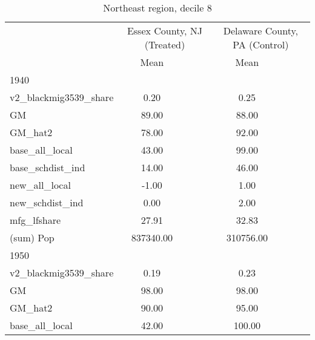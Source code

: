 \begin{table}[htbp]\centering
\def\sym#1{\ifmmode^{#1}\else\(^{#1}\)\fi}
\caption{Northeast region, decile 8 \label{tab1}}
\begin{tabular}{l*{2}{ccc}}
\toprule
                    &\multicolumn{3}{c}{Essex County, NJ (Treated)}&\multicolumn{3}{c}{Delaware County, PA (Control)}\\
                    &        Mean&            &            &        Mean&            &            \\
\midrule
1940                &            &            &            &            &            &            \\
v2\_blackmig3539\_share&        0.20&            &            &        0.25&            &            \\
GM                  &       89.00&            &            &       88.00&            &            \\
GM\_hat2             &       78.00&            &            &       92.00&            &            \\
base\_all\_local      &       43.00&            &            &       99.00&            &            \\
base\_schdist\_ind    &       14.00&            &            &       46.00&            &            \\
new\_all\_local       &       -1.00&            &            &        1.00&            &            \\
new\_schdist\_ind     &        0.00&            &            &        2.00&            &            \\
mfg\_lfshare         &       27.91&            &            &       32.83&            &            \\
(sum) Pop           &   837340.00&            &            &   310756.00&            &            \\
\midrule
1950                &            &            &            &            &            &            \\
v2\_blackmig3539\_share&        0.19&            &            &        0.23&            &            \\
GM                  &       98.00&            &            &       98.00&            &            \\
GM\_hat2             &       90.00&            &            &       95.00&            &            \\
base\_all\_local      &       42.00&            &            &      100.00&            &            \\

\end{tabular}
\end{table}
